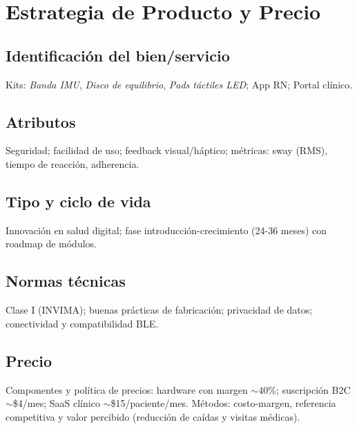 \section{Estrategia de Producto y Precio}
\subsection{Identificación del bien/servicio}
Kits: \emph{Banda IMU}, \emph{Disco de equilibrio}, \emph{Pads táctiles LED}; App RN; Portal clínico.

\subsection{Atributos}
Seguridad; facilidad de uso; feedback visual/háptico; métricas: sway (RMS), tiempo de reacción, adherencia.

\subsection{Tipo y ciclo de vida}
Innovación en salud digital; fase introducción-crecimiento (24-36 meses) con roadmap de módulos.

\subsection{Normas técnicas}
Clase I (INVIMA); buenas prácticas de fabricación; privacidad de datos; conectividad y compatibilidad BLE.

\subsection{Precio}
Componentes y política de precios: hardware con margen $\sim$40\%; suscripción B2C $\sim$\$4/mes; SaaS clínico $\sim$\$15/paciente/mes. Métodos: costo-margen, referencia competitiva y valor percibido (reducción de caídas y visitas médicas).
